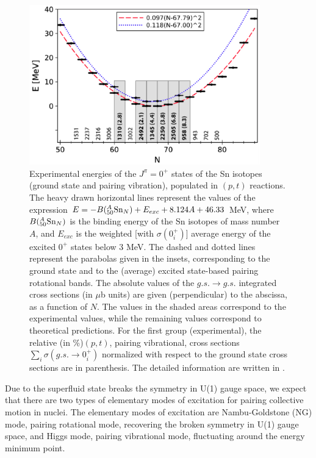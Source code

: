 \documentclass[11pt]{book} %
\begin{document}
\begin{figure}[tb]
 \begin{center}
    \includegraphics[width=100mm]{images/pair_rot.eps}
 \end{center}
  \caption{Experimental energies of the $J^{\pi}=0^+$ states of the Sn isotopes (ground state and pairing vibration),
populated in $(p, t)$ reactions. The heavy drawn horizontal lines
represent the values of the expression $E=-B({}_{50}^{A}{\rm Sn}_{N})+E_{exc}+
8.124A+46.33$ MeV, where $B({}_{50}^{A}{\rm Sn}_{N})$ is the binding energy
of the Sn isotopes of mass number $A$, and $E_{exc}$ is the
weighted [with $\sigma(0_i^+)$] average energy of the excited $0^+$ states
below 3 MeV. The dashed and dotted lines represent the parabolas
given in the insets, corresponding to the ground state and to
the (average) excited state-based pairing rotational bands. The
absolute values of the $g.s.\to g.s.$ integrated cross sections (in $\mu$b units) are given (perpendicular) to the abscissa, as a function
of $N$. The values in the shaded areas correspond to the experimental values, while the remaining values correspond to theoretical
predictions. For the first group (experimental), the relative
(in \%)$(p, t)$, pairing vibrational, cross sections $\sum_i\sigma(g.s.\to 0_i^+)$
normalized with respect to the ground state cross sections are in parenthesis. The detailed information are written in \cite{PF11}.}
  \label{pair_rot}
\end{figure}


Due to the superfluid state breaks the symmetry in U(1) gauge space, we expect that there are two types of elementary modes of excitation for pairing collective motion in nuclei. The elementary modes of excitation are Nambu-Goldstone (NG) mode, pairing rotational mode, recovering the broken symmetry in U(1) gauge space, and Higgs mode, pairing vibrational mode, fluctuating around the energy minimum point.
\end{document}
